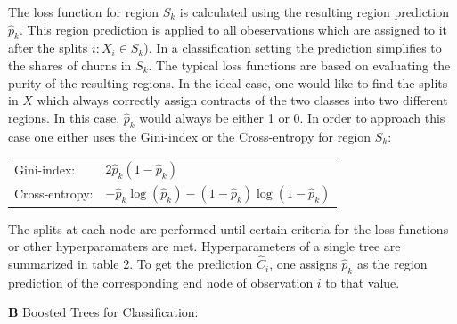 \documentclass[12pt,titlepage]{article}
\begin{document}
\noindent
The loss function for region $S_{k}$ is calculated using the resulting region prediction $\hat{p}_{k}$. This region prediction is applied to all obeservations which are assigned to it after the splits $i:X_{i}\in S_{k}$). In a classification setting the prediction simplifies to the shares of churns in $S_{k}$. The typical loss functions are based on evaluating the purity of the resulting regions. In the ideal case, one would like to find the splits in $X$ which always correctly assign contracts of the two classes into two different regions. In this case, $\hat{p}_{k}$ would always be either 1 or 0. In order to approach this case one either uses the Gini-index or the Cross-entropy for region $S_{k}$:
\vspace{5mm}
\begin{center}
    \begin{tabular}{ll}
        Gini-index: & $2\hat{p}_{k}(1-\hat{p}_{k})$ \\
        Cross-entropy: & $-\hat{p}_{k}\log(\hat{p}_{k}) - (1-\hat{p}_{k})\log(1-\hat{p}_{k})$ \\
    \end{tabular}
    \label{purity}
\end{center}
\vspace{5mm}
\noindent
The splits at each node are performed until certain criteria for the loss functions or other hyperparamaters are met. Hyperparameters of a single tree are summarized in table 2. To get the prediction $\hat{C}_{i}$, one assigns $\hat{p}_{k}$ as the region prediction of the corresponding end node of observation $i$ to that value. \\
\vspace{6mm}
\indent

\textbf{B} Boosted Trees for Classification: \\
\end{document}
